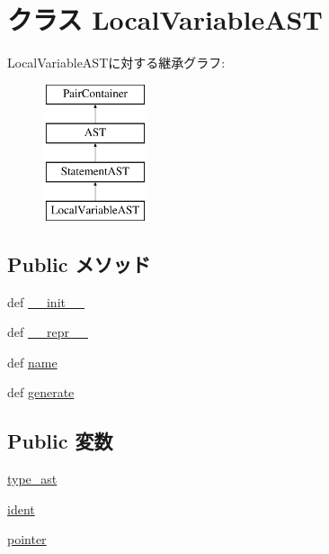 \hypertarget{classslicc_1_1ast_1_1LocalVariableAST_1_1LocalVariableAST}{
\section{クラス LocalVariableAST}
\label{classslicc_1_1ast_1_1LocalVariableAST_1_1LocalVariableAST}
}
LocalVariableASTに対する継承グラフ:\begin{figure}[H]
\begin{center}
\leavevmode
\includegraphics[height=4cm]{classslicc_1_1ast_1_1LocalVariableAST_1_1LocalVariableAST}
\end{center}
\end{figure}
\subsection*{Public メソッド}
\begin{DoxyCompactItemize}
\item 
def \hyperlink{classslicc_1_1ast_1_1LocalVariableAST_1_1LocalVariableAST_ac775ee34451fdfa742b318538164070e}{\_\-\_\-init\_\-\_\-}
\item 
def \hyperlink{classslicc_1_1ast_1_1LocalVariableAST_1_1LocalVariableAST_ad8b9328939df072e4740cd9a63189744}{\_\-\_\-repr\_\-\_\-}
\item 
def \hyperlink{classslicc_1_1ast_1_1LocalVariableAST_1_1LocalVariableAST_a757840459670ee7692e00cf5ddc722d5}{name}
\item 
def \hyperlink{classslicc_1_1ast_1_1LocalVariableAST_1_1LocalVariableAST_a4555d1cee0dccf3942ea35fe86de2e8e}{generate}
\end{DoxyCompactItemize}
\subsection*{Public 変数}
\begin{DoxyCompactItemize}
\item 
\hyperlink{classslicc_1_1ast_1_1LocalVariableAST_1_1LocalVariableAST_a2c41e611550596541faa6f64ffecc139}{type\_\-ast}
\item 
\hyperlink{classslicc_1_1ast_1_1LocalVariableAST_1_1LocalVariableAST_a2fe57e2d3d2cba9a3aeba2f629eaa78b}{ident}
\item 
\hyperlink{classslicc_1_1ast_1_1LocalVariableAST_1_1LocalVariableAST_a3f03bb7e120fad95c7a819c1cb088df9}{pointer}
\end{DoxyCompactItemize}


